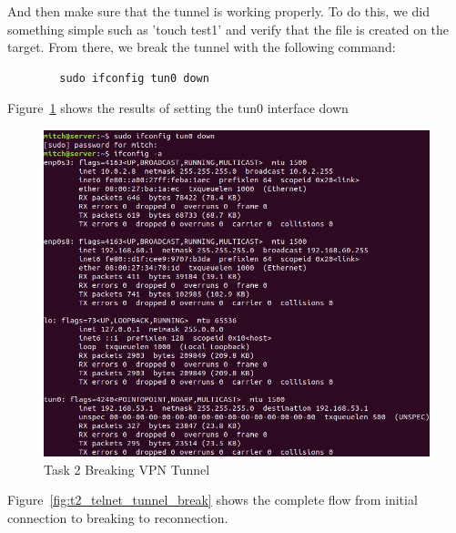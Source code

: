 \documentclass[12pt]{article}
\begin{document}
    And then make sure that the tunnel is working properly. To do this, we did something simple such as 'touch test1' and verify that the file is created on the target. From there, we break the tunnel with the following command:
    \begin{verbatim}
        sudo ifconfig tun0 down
    \end{verbatim}
    
    Figure~\ref{fig:t2_breaking_tunnel} shows the results of setting the tun0 interface down

    \begin{figure}[H]
        \begin{center}
            \includegraphics[scale=0.5]{t2_breaking_tunnel.png}
        \end{center}{}
        \caption{Task 2 Breaking VPN Tunnel}
        \label{fig:t2_breaking_tunnel}
    \end{figure}

    Figure~\ref{fig:t2_telnet_tunnel_break} shows the complete flow from initial connection to breaking to reconnection. 
\end{document}
